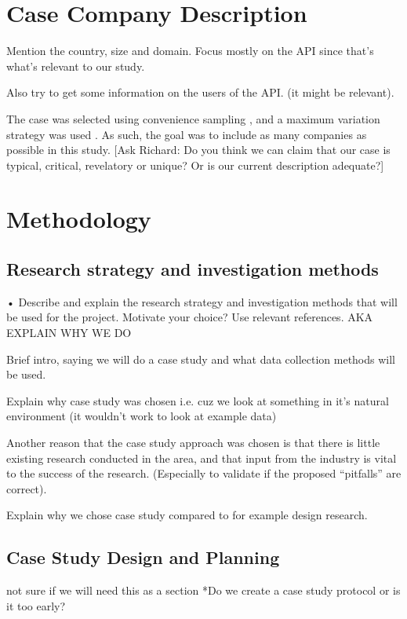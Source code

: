 \documentclass[10pt,twocolumn]{article}
\begin{document}
\section{Case Company Description}
Mention the country, size and domain. 
Focus mostly on the API since that's what's relevant to our study. 

Also try to get some information on the users of the API. (it might be relevant).

The case was selected using convenience sampling \cite{flyvbjerg2006five}, and a maximum variation strategy was used \cite{benbasat1987case}. As such, the goal was to include as many companies as possible in this study. [Ask Richard: Do you think we can claim that our case is typical, critical, revelatory or unique? Or is our current description adequate?]


\section{Methodology}

\subsection{Research strategy and investigation methods}
• Describe and explain the research strategy and investigation methods that will be used for the project. Motivate your choice? Use relevant references.
AKA EXPLAIN WHY WE DO 


Brief intro, saying we will do a case study \cite{runeson2009guidelines} and what data collection methods will be used. 

Explain why case study was chosen i.e. cuz we look at something in it's natural environment (it wouldn't work to look at example data)

Another reason that the case study approach was chosen is that there is little existing research conducted in the area, and that input from the industry is vital to the success of the research. (Especially to validate if the proposed ``pitfalls''  are correct).

Explain why we chose case study compared to for example design research.


\subsection{Case Study Design and Planning}

not sure if we will need this as a section
*Do we create a case study protocol or is it too early?
\end{document}

